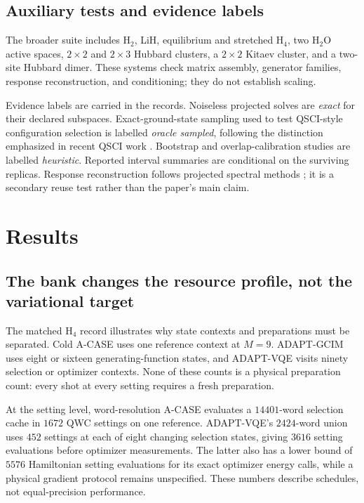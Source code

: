 \documentclass[aps,pra,reprint,superscriptaddress,nofootinbib,floatfix]{revtex4-2}
\begin{document}
\subsection{Auxiliary tests and evidence labels}
\label{sec:auxiliary}

The broader suite includes H$_2$, LiH, equilibrium and stretched H$_4$,
two H$_2$O active spaces, \(2\times2\) and \(2\times3\) Hubbard clusters,
a \(2\times2\) Kitaev cluster, and a two-site Hubbard dimer.  These systems
check matrix assembly, generator families, response reconstruction, and
conditioning; they do not establish scaling.

Evidence labels are carried in the records.  Noiseless projected solves are
\emph{exact} for their declared subspaces.  Exact-ground-state sampling used
to test QSCI-style configuration selection is labelled
\emph{oracle sampled}, following the distinction emphasized in recent QSCI
work \cite{nakagawa2024adaptqsci,kanno2026qsci,gaberle2026critical}.  Bootstrap
and overlap-calibration studies are labelled \emph{heuristic}.  Reported
interval summaries are conditional on the surviving replicas.  Response
reconstruction follows projected spectral methods
\cite{colless2018spectra,umeano2025response,patel2026qsense}; it is a secondary
reuse test rather than the paper's main claim.

\section{Results}
\label{sec:results}

\subsection{The bank changes the resource profile, not the variational target}
\label{sec:results-profile}

The matched H$_4$ record illustrates why state contexts and preparations must
be separated.  Cold A-CASE uses one reference context at \(M=9\).  ADAPT-GCIM
uses eight or sixteen generating-function states, and ADAPT-VQE visits ninety
selection or optimizer contexts.  None of these counts is a physical
preparation count: every shot at every setting requires a fresh preparation.

At the setting level, word-resolution A-CASE evaluates a \(14401\)-word
selection cache in \(1672\) QWC settings on one reference.  ADAPT-VQE's
\(2424\)-word union uses \(452\) settings at each of eight changing selection
states, giving \(3616\) setting evaluations before optimizer measurements.
The latter also has a lower bound of \(5576\) Hamiltonian setting evaluations
for its exact optimizer energy calls, while a physical gradient protocol
remains unspecified.  These numbers describe schedules, not equal-precision
performance.
\end{document}
